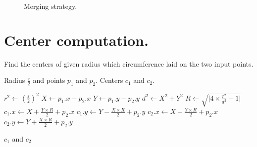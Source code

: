 \documentclass[journal,onecolumn]{IEEEtran}
\begin{document}
\begin{itemize}
\begin{figure}[!ht]
    \centering
    \hfill
    \caption{Merging strategy.}\label{fig:merge}
\end{figure}

\end{itemize}

\newpage 

\appendices
\section{Center computation.}\label{app:centers}

\begin{algorithm}
    \caption{Find the centers of given radius which circumference laid on the two input points.}
    \begin{algorithmic}[1]
        \Require Radius $\frac{\varepsilon}{2}$ and points $p_1$ and $p_2$.
        \Ensure Centers $c_1$ and $c_2$.
        
        \State $r^2 \gets (\frac{\varepsilon}{2})^2$
        \State $X \gets p_1.x - p_2.x$
        \State $Y \gets p_1.y - p_2.y$
        \State $d^2 \gets X^2 + Y^2$
        \State $R \gets \sqrt{\lvert 4 \times \frac{r^2}{d^2} - 1 \rvert}$
        \State $c_1.x \gets X + \frac{Y \times R}{2} + p_2.x$
        \State $c_1.y \gets Y - \frac{X \times R}{2} + p_2.y$
        \State $c_2.x \gets X - \frac{Y \times R}{2} + p_2.x$
        \State $c_2.y \gets Y + \frac{X \times R}{2} + p_2.y$
        
        \State \Return $c_1$ and $c_2$
        \EndFunction
    \end{algorithmic}
\end{algorithm}
\end{document}
